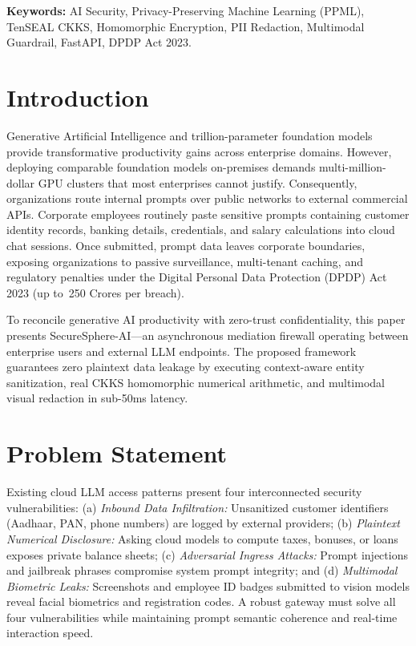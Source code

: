 \documentclass[10pt,a4paper]{article}
\begin{document}
\vspace{0.2cm}
\noindent\textbf{Keywords:} AI Security, Privacy-Preserving Machine Learning (PPML), TenSEAL CKKS, Homomorphic Encryption, PII Redaction, Multimodal Guardrail, FastAPI, DPDP Act 2023.

\section{Introduction}
Generative Artificial Intelligence and trillion-parameter foundation models provide transformative productivity gains across enterprise domains. However, deploying comparable foundation models on-premises demands multi-million-dollar GPU clusters that most enterprises cannot justify. Consequently, organizations route internal prompts over public networks to external commercial APIs. Corporate employees routinely paste sensitive prompts containing customer identity records, banking details, credentials, and salary calculations into cloud chat sessions. Once submitted, prompt data leaves corporate boundaries, exposing organizations to passive surveillance, multi-tenant caching, and regulatory penalties under the Digital Personal Data Protection (DPDP) Act 2023 (up to \rupee\,250 Crores per breach).

To reconcile generative AI productivity with zero-trust confidentiality, this paper presents SecureSphere-AI---an asynchronous mediation firewall operating between enterprise users and external LLM endpoints. The proposed framework guarantees zero plaintext data leakage by executing context-aware entity sanitization, real CKKS homomorphic numerical arithmetic, and multimodal visual redaction in sub-50ms latency.

\section{Problem Statement}
Existing cloud LLM access patterns present four interconnected security vulnerabilities: (a) \emph{Inbound Data Infiltration:} Unsanitized customer identifiers (Aadhaar, PAN, phone numbers) are logged by external providers; (b) \emph{Plaintext Numerical Disclosure:} Asking cloud models to compute taxes, bonuses, or loans exposes private balance sheets; (c) \emph{Adversarial Ingress Attacks:} Prompt injections and jailbreak phrases compromise system prompt integrity; and (d) \emph{Multimodal Biometric Leaks:} Screenshots and employee ID badges submitted to vision models reveal facial biometrics and registration codes. A robust gateway must solve all four vulnerabilities while maintaining prompt semantic coherence and real-time interaction speed.
\end{document}
